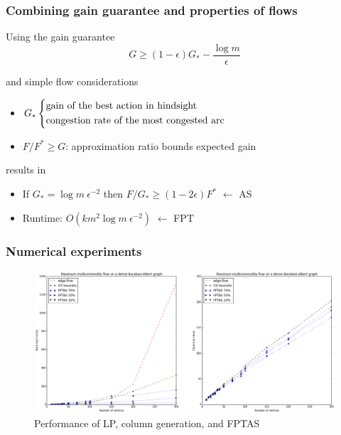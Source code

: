\documentclass{beamer}
\begin{document}
\begin{frame}
    \frametitle{Combining gain guarantee and properties of flows}

    \begin{block}{Using the gain guarantee}
        \begin{equation*}
            G \geq (1 - \epsilon) G_* - \dfrac{\log m}{\epsilon}
        \end{equation*}
        
    \end{block}

    \begin{block}{and simple flow considerations}
        \begin{itemize}
            \item $G_* \begin{dcases} 
                    \text{gain of the best action in hindsight}\\
                    \text{congestion rate of the most congested arc}
                \end{dcases}$
            \item $F / F^* \geq G$: approximation ratio bounds 
                expected gain
        \end{itemize}
    \end{block}

    \begin{block}{results in}
        \begin{itemize}
            \item If $G_* = \log m~\epsilon^{-2}$ then
                $F / G_* \geq (1 - 2\epsilon) F^*$ \alert{$\leftarrow$ AS}
            \item Runtime: $O(km^2\log m~\epsilon^{-2})$ \alert{$\leftarrow$ FPT}
        \end{itemize}
    \end{block}
\end{frame}

\begin{frame}
    \frametitle{Numerical experiments}
    
    \begin{figure}
    \includegraphics[width=\textwidth]{benchmark_multiflow_ba.png}
    \caption{Performance of LP, column generation, and FPTAS}
    \end{figure}

\end{frame}
\end{document}
